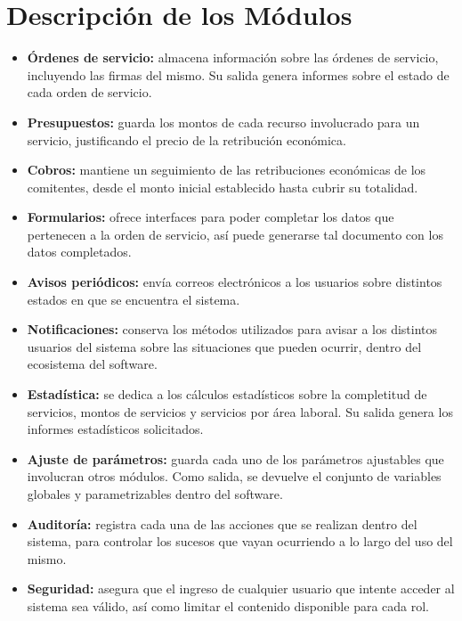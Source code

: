\section*{Descripci\'on de los M\'odulos}
\begin{itemize}
	\item \textbf{\'Ordenes de servicio:}
	almacena informaci\'on sobre las \'ordenes
	de servicio, incluyendo las firmas del mismo.
	Su salida genera informes sobre el estado de
	cada orden de servicio.
	\item \textbf{Presupuestos:} guarda los
	montos de cada recurso involucrado para un
	servicio, justificando el precio de la
	retribuci\'on econ\'omica.
	\item \textbf{Cobros:} mantiene un seguimiento
	de las retribuciones econ\'omicas de los
	comitentes, desde el monto inicial establecido
	hasta cubrir su totalidad.
	\item \textbf{Formularios:} ofrece interfaces
	para poder completar los datos que pertenecen
	a la orden de servicio, as\'i puede generarse
	tal documento con los datos completados.
	\item \textbf{Avisos peri\'odicos:} env\'ia
	correos electr\'onicos a los usuarios sobre
	distintos estados en que se encuentra el
	sistema.
	\item \textbf{Notificaciones:} conserva los
	m\'etodos utilizados para avisar a los
	distintos usuarios del sistema sobre las
	situaciones que pueden ocurrir, dentro del
	ecosistema del software.
	\item \textbf{Estad\'istica:} se dedica a los
	c\'alculos estad\'isticos sobre la completitud
	de servicios, montos de servicios y servicios
	por \'area laboral. Su salida genera los
	informes estad\'isticos solicitados.
	\item \textbf{Ajuste de par\'ametros:} guarda
	cada uno de los par\'ametros ajustables que
	involucran otros m\'odulos. Como salida, se
	devuelve el conjunto de variables globales y
	parametrizables dentro del software.
	\item \textbf{Auditor\'ia:} registra cada una
	de las acciones que se realizan dentro del
	sistema, para controlar los sucesos que vayan
	ocurriendo a lo largo del uso del mismo.
	\item \textbf{Seguridad:} asegura que el
	ingreso de cualquier usuario que intente
	acceder al sistema sea v\'alido, as\'i como
	limitar el contenido disponible para cada rol.
\end{itemize}
\newpage
